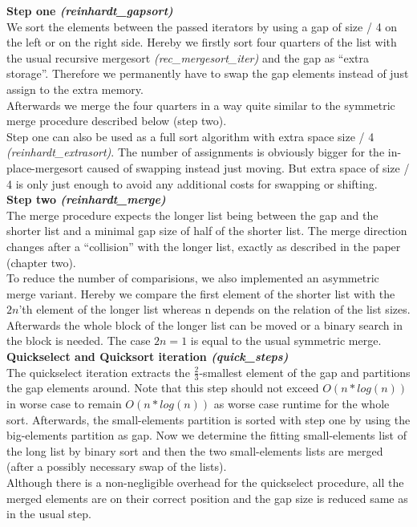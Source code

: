 \documentclass[11pt,pdftex,a4paper, twocolumn]{article}
\begin{document}
\textbf{Step one \textit{(reinhardt\_gapsort)}} \\
We sort the elements between the passed iterators by using a gap of size / 4 on the left or on the right side. Hereby we firstly sort four quarters of the list with the usual recursive mergesort \textit{(rec\_mergesort\_iter)} and the gap as “extra storage”. Therefore we permanently have to swap the gap elements instead of just assign to the extra memory. \\
Afterwards we merge the four quarters in a way quite similar to the symmetric merge procedure described below (step two). \\
Step one can also be used as a full sort algorithm with extra space size / 4 \textit{(reinhardt\_extrasort)}. The number of assignments is obviously bigger for the in-place-mergesort caused of swapping instead just moving. But extra space of size / 4 is only just enough to avoid any additional costs for swapping or shifting. \\
\textbf{Step two \textit{(reinhardt\_merge)}} \\
The merge procedure expects the longer list being between the gap and the shorter list and a minimal gap size of half of the shorter list. The merge direction changes after a “collision” with the longer list, exactly as described in the paper (chapter two). \\
To reduce the number of comparisions, we also implemented an asymmetric merge variant. Hereby we compare the first element of the shorter list with the $2n$’th element of the longer list whereas n depends on the relation of the list sizes. Afterwards the whole block of the longer list can be moved or a binary search in the block is needed. The case $2n = 1$ is equal to the usual symmetric merge. \\
\textbf{Quickselect and Quicksort iteration \textit{(quick\_steps)}} \\
The quickselect iteration extracts the $\frac{2}{3}$-smallest element of the gap and partitions the gap elements around. Note that this step should not exceed $O(n*log(n))$ in worse case to remain $O(n*log(n))$ as worse case runtime for the whole sort. Afterwards, the small-elements partition is sorted with step one by using the big-elements partition as gap. Now we determine the fitting small-elements list of the long list by binary sort and then the two small-elements lists are merged (after a possibly necessary swap of the lists). \\
Although there is a non-negligible overhead for the quickselect procedure, all the merged elements are on their correct position and the gap size is reduced same as in the usual step. \\
\end{document}
